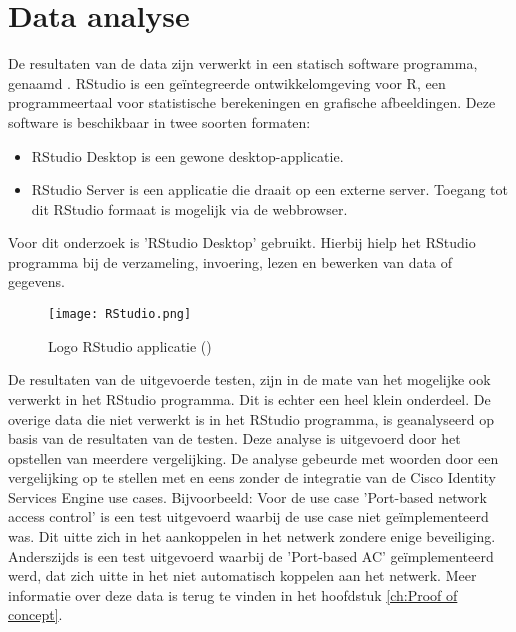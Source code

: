 \section{Data analyse}
\label{sec:Dataanalyse}
De resultaten van de data zijn verwerkt in een statisch software programma, genaamd \cite{RStudio}. RStudio is een geïntegreerde ontwikkelomgeving voor R, een programmeertaal voor statistische berekeningen en grafische afbeeldingen. Deze software is beschikbaar in twee soorten formaten:
\begin{itemize}
\item RStudio Desktop is een gewone desktop-applicatie. 
\item RStudio Server is een applicatie die draait op een externe server. Toegang tot dit RStudio formaat is mogelijk via de webbrowser.
\end{itemize} 
Voor dit onderzoek is 'RStudio Desktop' gebruikt. Hierbij hielp het RStudio programma bij de verzameling, invoering, lezen en bewerken van data of gegevens.
\begin{figure}[H]
	\centering
	\texttt{[image: RStudio.png]}
	\caption{Logo RStudio applicatie (\cite{RStudioLogo})}
	\label{fig:SPPS}
\end{figure}
De resultaten van de uitgevoerde testen, zijn in de mate van het mogelijke ook verwerkt in het RStudio programma. Dit is echter een heel klein onderdeel. De overige data die niet verwerkt is in het RStudio programma, is geanalyseerd op basis van de resultaten van de testen. Deze analyse is uitgevoerd door het opstellen van meerdere vergelijking. De analyse gebeurde met woorden door een vergelijking op te stellen met en eens zonder de integratie van de Cisco Identity Services Engine use cases. Bijvoorbeeld: Voor de use case 'Port-based network access control' is een test uitgevoerd waarbij de use case niet geïmplementeerd was. Dit uitte zich in het aankoppelen in het netwerk zondere enige beveiliging. Anderszijds is een test uitgevoerd waarbij de 'Port-based AC' geïmplementeerd werd, dat zich uitte in het niet automatisch koppelen aan het netwerk.   
\newline
\newline
Meer informatie over deze data is terug te vinden in het hoofdstuk \ref{ch:Proof of concept}.


